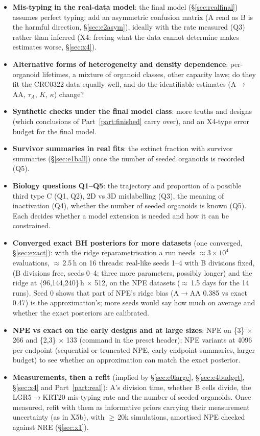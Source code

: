 \documentclass[10pt,a4paper]{article}
\newcommand{\tA}{$\tau_A$}
\newcommand{\code}[1]{\texttt{\detokenize{#1}}}
\begin{document}
\begin{itemize}
\item \textbf{Mis-typing in the real-data model}: the final model (\S\ref{sec:realfinal}) assumes perfect typing; add an asymmetric confusion matrix (A read as B is the harmful direction, \S\ref{sec:e2asym}), ideally with the rate measured (Q3) rather than inferred (X4: freeing what the data cannot determine makes estimates worse, \S\ref{sec:x4}).
\item \textbf{Alternative forms of heterogeneity and density dependence}: per-organoid lifetimes, a mixture of organoid classes, other capacity laws; do they fit the CRC0322 data equally well, and do the identifiable estimates (A$\to$AA, \tA, $K$, $\kappa$) change?
\item \textbf{Synthetic checks under the final model class}: more truths and designs (which conclusions of Part~\ref{part:finished} carry over), and an X4-type error budget for the final model.
\item \textbf{Survivor summaries in real fits}: the extinct fraction with survivor summaries (\S\ref{sec:e1ball}) once the number of seeded organoids is recorded (Q5).
\item \textbf{Biology questions Q1--Q5}: the trajectory and proportion of a possible third type C (Q1, Q2), 2D vs 3D mislabelling (Q3), the meaning of inactivation (Q4), whether the number of seeded organoids is known (Q5). Each decides whether a model extension is needed and how it can be constrained.
\item \textbf{Converged exact BH posteriors for more datasets} (one converged, \S\ref{sec:exact}): with the ridge reparametrisation a run needs $\approx 3\times10^4$ evaluations, $\approx$\,2.5\,h on 16 threads: real-like seeds 1--4 with B divisions fixed, \code{two_type} (B divisions free, seeds 0--4; three more parameters, possibly longer) and the ridge at \{96,144,240\}\,h $\times$ 512, on the NPE datasets ($\approx$\,1.5 days for the 14 runs). Seed 0 shows that part of NPE's ridge bias (A$\to$AA 0.385 vs exact 0.47) is the approximation's; more seeds would say how much on average and whether the exact posteriors are calibrated.
\item \textbf{NPE vs exact on the early designs and at large sizes}: NPE on \{3\} $\times$ 266 and \{2,3\} $\times$ 133 (command in the \code{exact_gw_early} preset header); NPE variants at 4096 per endpoint (sequential or truncated NPE, early-endpoint summaries, larger budget) to see whether an approximation can match the exact posterior.
\item \textbf{Measurements, then a refit} (implied by \S\ref{sec:e0large}, \S\ref{sec:e4budget}, \S\ref{sec:x4} and Part~\ref{part:real}): A's division time, whether B cells divide, the LGR5$\to$KRT20 mis-typing rate and the number of seeded organoids. Once measured, refit with them as informative priors carrying their measurement uncertainty (as in X5b), with $\ge$\,20k simulations, amortised NPE checked against NRE (\S\ref{sec:x1}).
\end{itemize}
\end{document}
